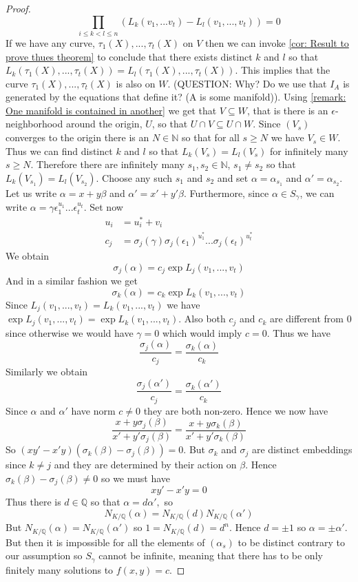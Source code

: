 \documentclass{article}
\newcommand{\mbb}[1]{\mathbb{#1}}
\begin{document}
\begin{proof}
    $$\prod_{i \leq k < l \leq n} (L_k(v_1, ...v_t) - L_l(v_1, ...,  v_t)) = 0$$
    If we have any curve, $\tau_1(X), ..., \tau_t(X)$ on $V$ then we can invoke \cref{cor: Result to prove thues theorem} to conclude that there exists distinct $k$ and $l$ so that $L_{k}(\tau_1(X), ..., \tau_t(X))= L_{l}(\tau_1(X), ..., \tau_t(X))$. This implies that the curve $\tau_1(X), ..., \tau_t(X)$ is also on $W$. (QUESTION: Why? Do we use that $I_A$ is generated by the equations that define it? (A is some manifold)). Using \cref{remark: One manifold is contained in another} we get that $V \subseteq W$, that is there is an $\epsilon$-neighborhood around the origin, $U$, so that $U \cap V \subseteq U \cap W$. Since $(V_s)$ converges to the origin there is an $N \in \mbb N$ so that for all $s \geq N$ we have $V_s \in W$. Thus we can find distinct $k$ and $l$ so that $L_k(V_s) = L_l(V_s)$ for infinitely many $s \geq N$. Therefore there are infinitely many $s_1, s_2 \in \mbb N$, $s_1 \neq s_2$ so that $L_k(V_{s_1}) = L_l(V_{s_2})$. Choose any such $s_1$ and $s_2$ and set $\alpha = \alpha_{s_1}$ and $\alpha' = \alpha_{s_2}$. Let us write $\alpha = x + y \beta$ and $\alpha' = x' + y'\beta$. Furthermore, since $\alpha \in S_\gamma$, we can write $\alpha = \gamma \epsilon_1^{u_1}...\epsilon_t^{u_t}$. Set now 
    \begin{align*}
        u_i &= u_i^* + v_i \\
        c_j &= \sigma_j(\gamma)\sigma_j(\epsilon_1)^{u_1^*}...\sigma_j(\epsilon_t)^{u_t^*}
    \end{align*}
    We obtain
    $$\sigma_j(\alpha) = c_j \exp L_j(v_1, ..., v_t)$$
    And in a similar fashion we get
    $$\sigma_k(\alpha) = c_k \exp L_k(v_1, ..., v_t)$$ 
    Since $L_j(v_1, ..., v_t) = L_k(v_1, ..., v_t)$ we have $\exp L_j(v_1, ..., v_t) = \exp L_k(v_1, ..., v_t)$. Also both $c_j$ and $c_k$ are different from 0 since otherwise we would have $\gamma = 0$ which would imply $c = 0$. Thus we have
    $$\frac{\sigma_j(\alpha)}{c_j} = \frac{\sigma_k(\alpha)}{c_k}$$
    Similarly we obtain 
    $$\frac{\sigma_j(\alpha')}{c_j} = \frac{\sigma_k(\alpha')}{c_k}$$
    Since $\alpha$ and $\alpha'$ have norm $c \neq 0$ they are both non-zero. Hence we now have
    $$\frac{x + y \sigma_j(\beta)}{x' + y' \sigma_j(\beta)} = \frac{x + y \sigma_k(\beta)}{x' + y' \sigma_k(\beta)}$$
    So
    $(xy' - x'y)(\sigma_k(\beta) - \sigma_j(\beta)) = 0$.
    But $\sigma_k$ and $\sigma_j$ are distinct embeddings since $k \neq j$ and they are determined by their action on $\beta$. Hence $\sigma_k(\beta) - \sigma_j(\beta) \neq 0$ so we must have 
    $$xy' - x'y = 0$$
    Thus there is $d \in \mbb Q$ so that
    $\alpha = d\alpha',$ so $$N_{K/\mbb Q}(\alpha) = N_{K/\mbb Q}(d) N_{K/\mbb Q}(\alpha')$$
    But $N_{K/\mbb Q}(\alpha) = N_{K/\mbb Q}(\alpha')$ so $1 = N_{K/\mbb Q}(d) = d^n$. Hence $d = \pm 1$ so $\alpha = \pm \alpha'$. But then it is impossible for all the elements of $(\alpha_s)$ to be distinct contrary to our assumption so $S_\gamma$ cannot be infinite, meaning that there has to be only finitely many solutions to $f(x, y) = c$. 
\end{proof}
\end{document}

